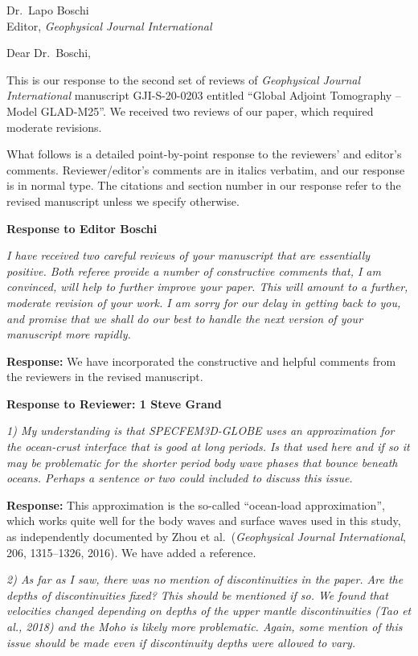 \documentclass[11pt,a4paper]{letter}
\newcommand{\response}[1]{\textbf{Response:} #1}
\newcommand{\rev}[1]{{\it{#1}}}
\begin{document}
 

\begin{letter}{Dr.~Lapo Boschi\\
Editor, \textit{Geophysical Journal International}} 

\opening{Dear Dr.~Boschi,} 

This is our response to the second set of reviews of \textit{Geophysical Journal International\/} manuscript GJI-S-20-0203 entitled ``Global Adjoint Tomography -- Model GLAD-M25''.
We received two reviews of our paper, which required moderate revisions.

What follows is a detailed point-by-point response to the reviewers' and editor's comments.
Reviewer/editor's comments are in italics verbatim, and our response is in normal type. The citations and section number in our response refer to the revised manuscript unless we specify otherwise.

{\textbf{\large Response to Editor Boschi}}

\rev{
I have received two careful reviews of your manuscript that are essentially positive. Both referee provide a number of constructive comments that, I am convinced, will help to further improve your paper. This will amount to a further, moderate revision of your work. I am sorry for our delay in getting back to you, and promise that we shall do our best to handle the next version of your manuscript more rapidly.
}

\response{
We have incorporated the constructive and helpful comments from the reviewers in the revised manuscript.
}


{\textbf{\large Response to Reviewer: 1 Steve Grand}}

\rev{
1) My understanding is that SPECFEM3D-GLOBE uses an approximation for the ocean-crust interface that is good at long periods. Is that used here and if so it may be problematic for the shorter period body wave phases that bounce beneath oceans. Perhaps a sentence or two could included to discuss this issue.
}

\response{
This approximation is the so-called ``ocean-load approximation'', which works quite well for the body waves and surface waves used in this study, as independently documented by Zhou et al.~({\it Geophysical Journal International}, 206, 1315--1326, 2016).
We have added a reference.
}

\rev{
2) As far as I saw, there was no mention of discontinuities in the paper. Are the depths of discontinuities fixed? This should be mentioned if so. We found that velocities changed depending on depths of the upper mantle discontinuities (Tao et al., 2018) and the Moho is likely more problematic. Again, some mention of this issue should be made even if discontinuity depths were allowed to vary.
}


\end{letter}
\end{document}
